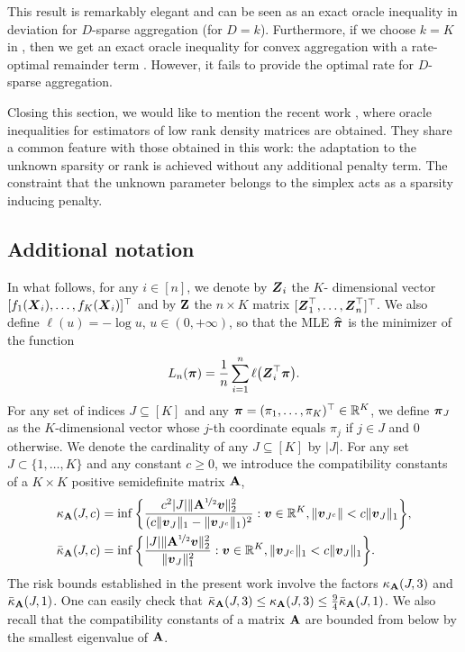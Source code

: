 This result is remarkably elegant and can be seen as an exact oracle inequality in deviation for $D$-sparse aggregation (for $D=k$).
Furthermore, if we choose $k=K$ in , then we get an exact oracle inequality for convex aggregation with a
rate-optimal remainder term  \citep{Tsybakov03}. However, it fails to provide the optimal rate for $D$-sparse aggregation.

Closing this section, we would like to mention the recent work \citep{Xia16}, where oracle inequalities for estimators of low rank
density matrices are obtained. They share a common feature with those obtained in this work: the adaptation to the unknown sparsity
or rank is achieved without any additional penalty term. The constraint that the unknown parameter belongs to the simplex acts
as a sparsity inducing penalty.

\subsection{Additional notation}

In what follows, for any $i\in [n]$, we denote by $\boldsymbol Z_i$ the $K$- dimensional vector $[f_1(\boldsymbol X_i),\ldots,f_K(\boldsymbol X_i)]^\top$ and
by $\mathbf Z$ the $n\times K$ matrix  $[\boldsymbol Z^\top_1,\ldots,\boldsymbol Z^\top_n]^\top$. We also define $\ell(u) = -\log u$,
$u\in(0,+\infty)$,
so that the MLE $\widehat{\boldsymbol \pi}$ is the minimizer of the function
\begin{equation}
\label{Phi}
L_n(\boldsymbol \pi) = \frac1n\sum_{i=1}^n \ell\big(\boldsymbol Z_i^\top\boldsymbol \pi\big).
\end{equation}
For any set of indices $J\subseteq [K]$ and any $\boldsymbol \pi=(\pi_1,\dots,\pi_K)^{\top}\in{\mathbb R}^K$,
we define $\boldsymbol \pi_J$ as the $K$-dimensional vector whose $j$-th coordinate equals $\pi_j$ if $j\in J$ and $0$ otherwise.
We denote the cardinality of any $J\subseteq[K]$ by $\vert J\vert$. For any set $J\subset \{1, \dots, K\}$ and any
constant $c\geq 0$, we introduce the compatibility constants \citep{VandeGeerConditionLasso09}
of a $K\times K$ positive semidefinite matrix $\mathbf A$,
\begin{align}
\kappa_{\mathbf A}(J,c) &= \inf\bigg\{ \frac{c^2|J|\|\mathbf A^{\nicefrac12}\boldsymbol v \|_2^2}{(c\|\boldsymbol v_J\|_1-\|\boldsymbol v_{J^c}\|_1)^2} :
\boldsymbol v\in{\mathbb R}^K,\|\boldsymbol v_{J^c}\|< c\|\boldsymbol v_J\|_1\bigg\},\\
\bar\kappa_\mathbf A(J,c) &=\inf\bigg\{\frac{|J|\|\mathbf A^{\nicefrac12}\boldsymbol v\|_2^{2}}{\Vert \boldsymbol v_{J}\Vert^{2}_{1}}:
\boldsymbol v\in{\mathbb R}^{K},\Vert \boldsymbol v_{J^{c}}\Vert_{1}<c\Vert \boldsymbol v_{J}\Vert_{1}\bigg\}.
\end{align}
The risk bounds established in the present work involve the factors $\kappa_{\mathbf A}(J,3)$ and
$\bar\kappa_{\mathbf A}(J,1)$. One can easily check that $\bar\kappa_{\mathbf A}(J,3)\le \kappa_{\mathbf A}(J,3)
\le \frac94 \bar\kappa_{\mathbf A}(J,1)$. We also recall that the compatibility constants of a matrix
$\mathbf A$ are bounded  from below by the smallest eigenvalue of $\mathbf A$.

